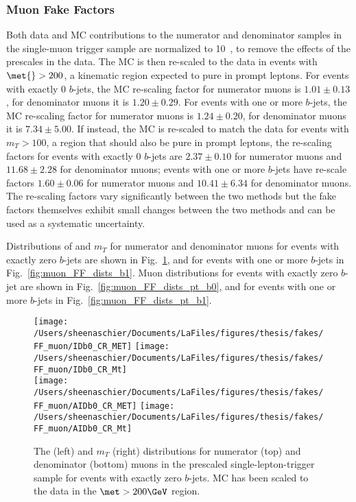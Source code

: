  \subsubsection{Muon Fake Factors}
 Both data and MC contributions to the numerator and denominator samples in the single-muon trigger sample are normalized to 10~\ipb, to remove the effects of the prescales in the data.  The MC is then re-scaled to the data in events with $\met{}>200$\GeV, a kinematic region expected to pure in prompt leptons.  For events with exactly 0 $b$-jets, the MC re-scaling factor for numerator muons is $1.01 \pm 0.13$, for denominator muons it is $1.20\pm 0.29$. For events with one or more $b$-jets, the MC re-scaling factor for numerator muons is $1.24 \pm 0.20$, for denominator muons it is $7.34\pm 5.00$. If instead, the MC is re-scaled to match the data for events with $m_{T} > 100$\GeV, a region that should also be pure in prompt leptons, the re-scaling factors for events with exactly 0 $b$-jets are $2.37 \pm 0.10$ for numerator muons and $11.68 \pm 2.28$ for denominator muons; events with one or more $b$-jets have re-scale factors $1.60 \pm 0.06$ for numerator muons and $10.41 \pm 6.34$ for denominator muons. The re-scaling factors vary significantly between the two methods but the fake factors themselves exhibit small changes between the two methods and can be used as a systematic uncertainty.

Distributions of \met{} and $m_{T}$ for numerator and denominator muons for events with exactly zero $b$-jets are shown in Fig.~\ref{fig:muon_FF_dists_b0}, and for events with one or more $b$-jets in Fig.~\ref{fig:muon_FF_dists_b1}.  Muon \pt{} distributions for events with exactly zero $b$-jet are shown in Fig.~\ref{fig:muon_FF_dists_pt_b0}, and for events with one or more $b$-jets in Fig.~\ref{fig:muon_FF_dists_pt_b1}.

\begin{figure}[tbp]
  \centering
  \texttt{[image: /Users/sheenaschier/Documents/LaFiles/figures/thesis/fakes/FF\_muon/IDb0\_CR\_MET]}
  \texttt{[image: /Users/sheenaschier/Documents/LaFiles/figures/thesis/fakes/FF\_muon/IDb0\_CR\_Mt]}\\
  \texttt{[image: /Users/sheenaschier/Documents/LaFiles/figures/thesis/fakes/FF\_muon/AIDb0\_CR\_MET]}
  \texttt{[image: /Users/sheenaschier/Documents/LaFiles/figures/thesis/fakes/FF\_muon/AIDb0\_CR\_Mt]}
  \caption{The \met{} (left) and  $m_{T}$ (right) distributions for numerator (top) and denominator (bottom) muons in the prescaled single-lepton-trigger sample for events with exactly zero $b$-jets.  MC has been scaled to the data in the $\met > 200\GeV$ region.}
  \label{fig:muon_FF_dists_b0}
\end{figure}

